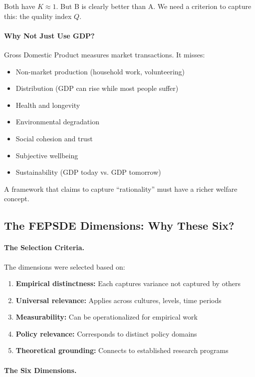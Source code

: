 \documentclass[12pt,a4paper]{article}
\begin{document}
Both have $K \approx 1$. But B is clearly better than A.
We need a criterion to capture this: the quality index $Q$.

\paragraph{Why Not Just Use GDP?}
Gross Domestic Product measures market transactions.
It misses:
\begin{itemize}
  \item Non-market production (household work, volunteering)
  \item Distribution (GDP can rise while most people suffer)
  \item Health and longevity
  \item Environmental degradation
  \item Social cohesion and trust
  \item Subjective wellbeing
  \item Sustainability (GDP today vs. GDP tomorrow)
\end{itemize}

A framework that claims to capture ``rationality'' must have a richer welfare concept.

\subsection{The FEPSDE Dimensions: Why These Six?}

\paragraph{The Selection Criteria.}
The dimensions were selected based on:
\begin{enumerate}
  \item \textbf{Empirical distinctness:} Each captures variance not captured by others
  \item \textbf{Universal relevance:} Applies across cultures, levels, time periods
  \item \textbf{Measurability:} Can be operationalized for empirical work
  \item \textbf{Policy relevance:} Corresponds to distinct policy domains
  \item \textbf{Theoretical grounding:} Connects to established research programs
\end{enumerate}

\paragraph{The Six Dimensions.}
\end{document}
